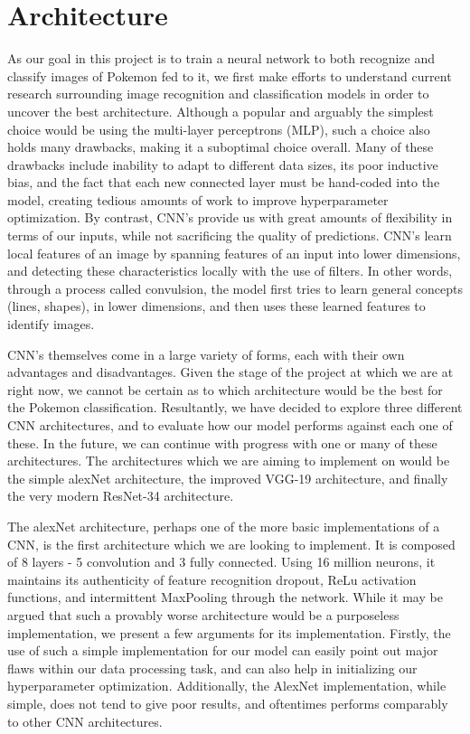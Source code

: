 \documentclass{article} %
\begin{document}
\section {Architecture}

As our goal in this project is to train a neural network to both recognize and classify images of Pokemon fed to it, we first make efforts to understand current research surrounding image recognition and classification models in order to uncover the best architecture. Although a popular and arguably the simplest choice would be using the multi-layer perceptrons (MLP), such a choice also holds many drawbacks, making it a suboptimal choice overall. Many of these drawbacks include inability to adapt to different data sizes, its poor inductive bias, and the fact that each new connected layer must be hand-coded into the model, creating tedious amounts of work to improve hyperparameter optimization. By contrast, CNN's provide us with great amounts of flexibility in terms of our inputs, while not sacrificing the quality of predictions. CNN's learn local features of an image by spanning features of an input into lower dimensions, and detecting these characteristics locally with the use of filters. In other words, through a process called convulsion, the model first tries to learn general concepts (lines, shapes), in lower dimensions, and then uses these learned features to identify images. 

CNN's themselves come in a large variety of forms, each with their own advantages and disadvantages. Given the stage of the project at which we are at right now, we cannot be certain as to which architecture would be the best for the Pokemon classification. Resultantly, we have decided to explore three different CNN architectures, and to evaluate how our model performs against each one of these. In the future, we can continue with progress with one or many of these architectures. The architectures which we are aiming to implement on would be the simple alexNet architecture, the improved VGG-19 architecture, and finally the very modern ResNet-34 architecture. 

The alexNet architecture, perhaps one of the more basic implementations of a CNN, is the first architecture which we are looking to implement. It is composed of 8 layers - 5 convolution and 3 fully connected. Using 16 million neurons, it maintains its authenticity of feature recognition dropout, ReLu activation functions, and intermittent MaxPooling through the network. While it may be argued that such a provably worse architecture would be a purposeless implementation, we present a few arguments for its implementation. Firstly, the use of such a simple implementation for our model can easily point out major flaws within our data processing task, and can also help in initializing our hyperparameter optimization. Additionally, the AlexNet implementation, while simple, does not tend to give poor results, and oftentimes performs comparably to other CNN architectures.
\end{document}
